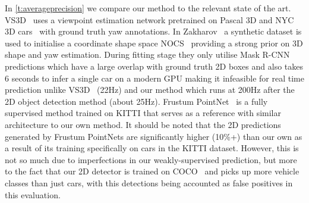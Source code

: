 In \cref{t:averageprecision} we compare our method to the relevant state of the art.
VS3D~\cite{qin20weakly} uses a viewpoint estimation network pretrained on Pascal 3D and NYC 3D cars~\cite{xiang_wacv14, MatzenICCV13} with ground truth yaw annotations.
In Zakharov~\cite{zakharov20autolabeling} a synthetic dataset is used to initialise a coordinate shape space NOCS~\cite{Wang_2019_CVPR} providing a strong prior on 3D shape and yaw estimation.
During fitting stage they only utilise Mask R-CNN predictions which have a large overlap with ground truth 2D boxes and also takes 6 seconds to infer a single car on a modern GPU making it infeasible for real time prediction unlike VS3D~\cite{qin20weakly} (22Hz) and our method which runs at 200Hz after the 2D object detection method (about 25Hz).
Frustum PointNet~\cite{qi2017frustum} is a fully supervised method trained on KITTI that serves as a reference with similar architecture to our own method.
It should be noted that the 2D predictions generated by Frustum PointNets are significantly higher (10\%+) than our own as a result of its training specifically on cars in the KITTI dataset.
However, this is not so much due to imperfections in our weakly-supervised prediction, but more to the fact that our 2D detector is trained on COCO~\cite{lin2014microsoft} and picks up more vehicle classes than just cars, with this detections being accounted as false positives in this evaluation.




% 


% 